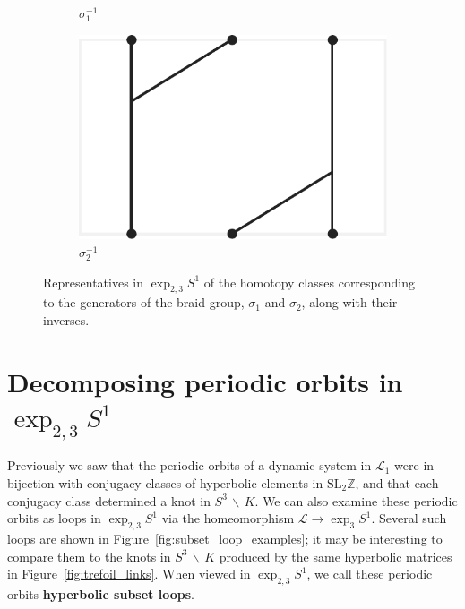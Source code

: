 \documentclass[12pt,twoside]{reedthesis}
\theoremstyle{definition}
\newcommand{\Z}{\mathbb{Z}}
\newcommand{\LS}{\mathcal{L}}
\newcommand{\SLZ}{\mathrm{SL}_2{\Z}}
\newcommand{\wo}{\, \backslash \,}
\newcommand{\defnphrase}[1]{\textbf{#1}}
\begin{document}
\begin{figure}[h]
\begin{subfigure}[t]{0.23\textwidth}
    \caption{$\sigma_1^{-1}$}
  \end{subfigure}
  \hfill
  \begin{subfigure}[t]{0.23\textwidth}
    \centering
    \includegraphics[width=\textwidth]{figures/braid_gen_b_inv.pdf}
    \caption{$\sigma_2^{-1}$}
  \end{subfigure}
  \caption{Representatives in $\exp_{2,3} S^1$ of the homotopy classes corresponding to the generators of the braid group, $\sigma_1$ and $\sigma_2$, along with their inverses.}
  \label{fig:gen_paths_under_iso_shared}
\end{figure}

\section{Decomposing periodic orbits in $\exp_{2,3} S^1$}

Previously we saw that the periodic orbits of a dynamic system in $\LS_1$ were in bijection with conjugacy classes of hyperbolic elements in $\SLZ$, and that each conjugacy class determined a knot in $S^3 \wo K$.
We can also examine these periodic orbits as loops in $\exp_{2,3} S^1$ via the homeomorphism $\LS \to \exp_3 S^1$.
Several such loops are shown in Figure~\ref{fig:subset_loop_examples}; it may be interesting to compare them to the knots in $S^3 \wo K$ produced by the same hyperbolic matrices in Figure~\ref{fig:trefoil_links}.
When viewed in $\exp_{2,3} S^1$, we call these periodic orbits \defnphrase{hyperbolic subset loops}.
\end{document}
